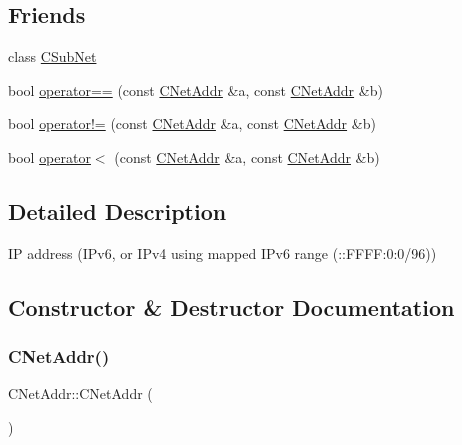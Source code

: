 \subsection*{Friends}
\begin{DoxyCompactItemize}
\item 
class \mbox{\hyperlink{class_c_net_addr_a1c694dd7d8a349bd3a1816a2634d7d2a}{C\+Sub\+Net}}
\item 
bool \mbox{\hyperlink{class_c_net_addr_a6cc88956853ab8dc9586d55cda059934}{operator==}} (const \mbox{\hyperlink{class_c_net_addr}{C\+Net\+Addr}} \&a, const \mbox{\hyperlink{class_c_net_addr}{C\+Net\+Addr}} \&b)
\item 
bool \mbox{\hyperlink{class_c_net_addr_ac361eb83c41464359dfb1dfc296c3a4c}{operator!=}} (const \mbox{\hyperlink{class_c_net_addr}{C\+Net\+Addr}} \&a, const \mbox{\hyperlink{class_c_net_addr}{C\+Net\+Addr}} \&b)
\item 
bool \mbox{\hyperlink{class_c_net_addr_af220590d55a24354e2ba2e547e34fd77}{operator$<$}} (const \mbox{\hyperlink{class_c_net_addr}{C\+Net\+Addr}} \&a, const \mbox{\hyperlink{class_c_net_addr}{C\+Net\+Addr}} \&b)
\end{DoxyCompactItemize}


\subsection{Detailed Description}
IP address (I\+Pv6, or I\+Pv4 using mapped I\+Pv6 range (\+::\+F\+F\+FF\+:0\+:0/96)) 

\subsection{Constructor \& Destructor Documentation}
\mbox{\label{class_c_net_addr_ad997a7ab057fbeab1dd6601135f8e02d}} 
\subsubsection{\texorpdfstring{C\+Net\+Addr()}{CNetAddr()}\hspace{0.1cm}{\footnotesize\ttfamily [1/5]}}
{\footnotesize\ttfamily C\+Net\+Addr\+::\+C\+Net\+Addr (\begin{DoxyParamCaption}{ }\end{DoxyParamCaption})}

\mbox{\label{class_c_net_addr_a0af492cd8aca9bbaa3392cdbfbb55681}} 
